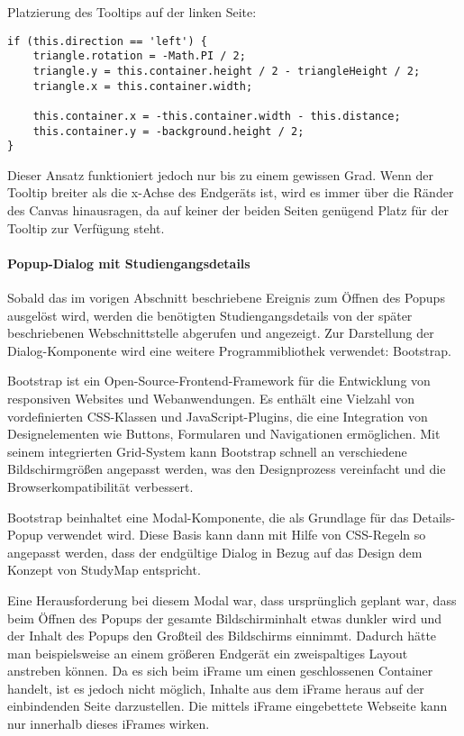 \noindent
Platzierung des Tooltips auf der linken Seite:
\begin{lstlisting}[style=Python]
if (this.direction == 'left') {
    triangle.rotation = -Math.PI / 2;
    triangle.y = this.container.height / 2 - triangleHeight / 2;
    triangle.x = this.container.width;

    this.container.x = -this.container.width - this.distance;
    this.container.y = -background.height / 2;
}
\end{lstlisting}

Dieser Ansatz funktioniert jedoch nur bis zu einem gewissen Grad. Wenn der Tooltip breiter als die x-Achse des Endgeräts ist, wird es immer über die Ränder des Canvas hinausragen, da auf keiner der beiden Seiten genügend Platz für der Tooltip zur Verfügung steht. %

\paragraph*{Popup-Dialog mit Studiengangsdetails}
Sobald das im vorigen Abschnitt beschriebene Ereignis zum Öffnen des Popups ausgelöst wird, werden die benötigten Studiengangsdetails von der später beschriebenen Webschnittstelle abgerufen und angezeigt. Zur Darstellung der Dialog-Komponente wird eine weitere Programmibliothek verwendet: Bootstrap.

Bootstrap ist ein Open-Source-Frontend-Framework für die Entwicklung von responsiven Websites und Webanwendungen. Es enthält eine Vielzahl von vordefinierten CSS-Klassen und JavaScript-Plugins, die eine Integration von Designelementen wie Buttons, Formularen und Navigationen ermöglichen. \parencite{otto_bootstrap_2024} Mit seinem integrierten Grid-System kann Bootstrap schnell an verschiedene Bildschirmgrößen angepasst werden, was den Designprozess vereinfacht und die Browserkompatibilität verbessert. \parencite{otto_browsers_2024}

Bootstrap beinhaltet eine Modal-Komponente, die als Grundlage für das Details-Popup verwendet wird. \parencite{otto_modal_2024} Diese Basis kann dann mit Hilfe von CSS-Regeln so angepasst werden, dass der endgültige Dialog in Bezug auf das Design dem Konzept von StudyMap entspricht.

Eine Herausforderung bei diesem Modal war, dass ursprünglich geplant war, dass beim Öffnen des Popups der gesamte Bildschirminhalt etwas dunkler wird und der Inhalt des Popups den Großteil des Bildschirms einnimmt. Dadurch hätte man beispielsweise an einem größeren Endgerät ein zweispaltiges Layout anstreben können. Da es sich beim iFrame um einen geschlossenen Container handelt, ist es jedoch nicht möglich, Inhalte aus dem iFrame heraus auf der einbindenden Seite darzustellen. Die mittels iFrame eingebettete Webseite kann nur innerhalb dieses iFrames wirken. %

